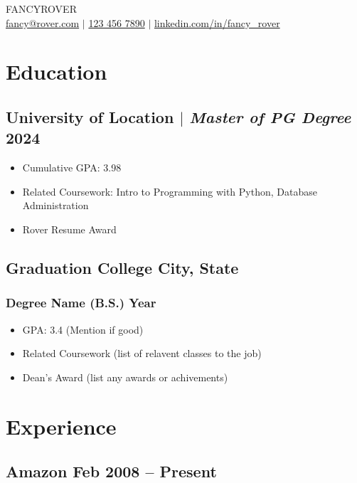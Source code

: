 \documentclass[11pt]{article}
\begin{document}
\begin{center}
    {\fontsize{36}{36}\selectfont\interthin FANCY\interheavy ROVER} \\ \bigskip
    {\color{icnclr}\faEnvelope[regular]} \href{mailto:hi@example.com}{fancy@rover.com} $|$ 
    {\color{icnclr}} \href{tel:1234567890}{123 456 7890} $|$
    {\color{icnclr}\faLinkedinIn} \href{https://www.linkedin.com/}{linkedin.com/in/fancy\_rover}
\end{center}

\section{Education}
\subsection{University of Location $|$ {\normalfont\textit{Master of PG Degree}} \hfill 2024}
\begin{itemize}
    \item Cumulative GPA: 3.98
    \item Related Coursework: Intro to Programming with Python, Database Administration
    \item Rover Resume Award
\end{itemize}

\subsection{Graduation College \hfill City, State}
\subsubsection{Degree Name (B.S.) \hfill Year}
\begin{itemize}
    \item GPA: 3.4 (Mention if good)
    \item Related Coursework (list of relavent classes to the job)
    \item Dean's Award (list any awards or achivements)
\end{itemize}

\section{Experience}
\subsection{Amazon \hfill Feb 2008 -- Present}
\end{document}
